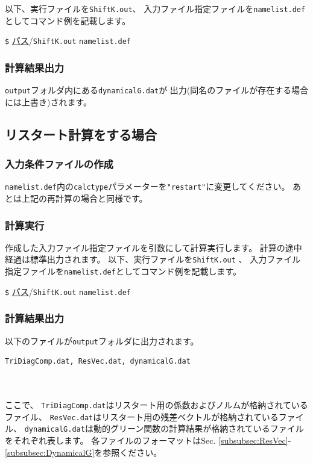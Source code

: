\documentclass[12pt,titlepage]{jarticle}
\begin{document}
以下、実行ファイルを\verb|ShiftK.out|、
入力ファイル指定ファイルを\verb|namelist.def|としてコマンド例を記載します。

\verb|$| \underline{パス}/\verb|ShiftK.out|  \verb|namelist.def|

\subsubsection*{計算結果出力}
\verb|output|フォルダ内にある\verb|dynamicalG.dat|が
出力(同名のファイルが存在する場合には上書き)されます。

\subsection{リスタート計算をする場合}
\subsubsection*{入力条件ファイルの作成}
\verb|namelist.def|内の\verb|calctype|パラメーターを\verb|"restart"|に変更してください。
あとは上記の再計算の場合と同様です。

\subsubsection*{計算実行}
作成した入力ファイル指定ファイルを引数にして計算実行します。
計算の途中経過は標準出力されます。
以下、実行ファイルを\verb|ShiftK.out| 、
入力ファイル指定ファイルを\verb|namelist.def|としてコマンド例を記載します。

\verb|$| \underline{パス}/\verb|ShiftK.out|  \verb|namelist.def|

\subsubsection*{計算結果出力}
以下のファイルが\verb|output|フォルダに出力されます。
\\
\begin{minipage}{11cm}
\begin{screen}
\begin{verbatim}
TriDiagComp.dat, ResVec.dat, dynamicalG.dat
\end{verbatim}
\end{screen}
\end{minipage}
\\ \\
ここで、
\verb|TriDiagComp.dat|はリスタート用の係数およびノルムが格納されているファイル、
\verb|ResVec.dat|はリスタート用の残差ベクトルが格納されているファイル、
\verb|dynamicalG.dat|は動的グリーン関数の計算結果が格納されているファイルをそれぞれ表します。
各ファイルのフォーマットはSec. \ref{subsubsec:ResVec}-\ref{subsubsec:DynamicalG}を参照ください。
\end{document}
